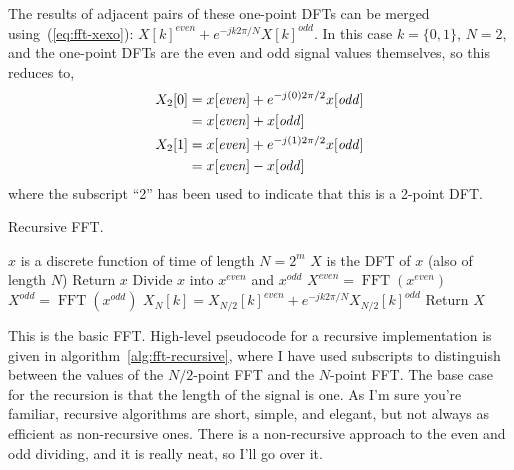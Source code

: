 The results of adjacent pairs of these one-point DFTs can be merged
using~(\ref{eq:fft-xexo}): $X[k]^{\mathit{even}} +
e^{-jk2\pi/N}X[k]^{\mathit{odd}}$. In this case $k=\{0,1\}$, $N=2$,
and the one-point DFTs are the even and odd signal values themselves,
so this reduces to,
\begin{align}
  X_2[0] &= x[\mathit{even}] + e^{-j(0)2\pi/2}x[\mathit{odd}] \notag \\
         &= x[\mathit{even}] + x[\mathit{odd}] \label{eq:2fft-even}\\
  X_2[1] &= x[\mathit{even}] + e^{-j(1)2\pi/2}x[\mathit{odd}] \notag \\
         &= x[\mathit{even}] - x[\mathit{odd}] \label{eq:2fft-odd}
\end{align}
where the subscript ``2'' has been used to indicate that this is a
2-point DFT.

\begin{algorithm}
\caption{Recursive FFT.\label{alg:fft-recursive}}
\begin{algorithmic}
\REQUIRE $x$ is a discrete function of time of length $N=2^m$
\ENSURE $X$ is the DFT of $x$ (also of length $N$)
   \STATE Return $x$
\ELSE
   \STATE Divide $x$ into $x^\mathit{even}$ and $x^\mathit{odd}$
   \STATE $X^\mathit{even} = \operatorname{FFT}(x^\mathit{even})$
   \STATE $X^\mathit{odd} = \operatorname{FFT}(x^\mathit{odd})$
      \STATE $X_N[k] = X_{N/2}[k]^\mathit{even} +
                       e^{-jk2\pi/N}X_{N/2}[k]^\mathit{odd}$ 
   \ENDFOR
   \STATE Return $X$
\ENDIF
\end{algorithmic}
\end{algorithm}

This is the basic FFT.  High-level pseudocode for a recursive
implementation is given in algorithm~\ref{alg:fft-recursive}, where I
have used subscripts to distinguish between the values of the
$N/2$-point FFT and the $N$-point FFT. The base case for the recursion
is that the length of the signal is one. As I'm sure you're familiar,
recursive algorithms are short, simple, and elegant, but not always as
efficient as non-recursive ones.  There is a non-recursive approach to
the even and odd dividing, and it is really neat, so I'll go over it.

